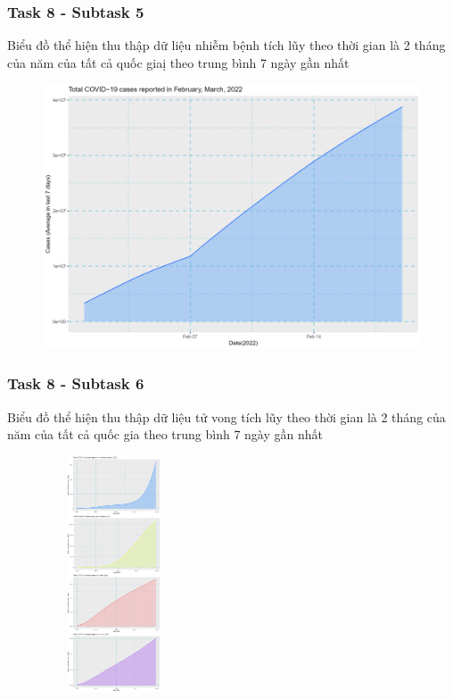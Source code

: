 \documentclass[english,10pt,table]{beamer}
\begin{document}
{
    \frametitle{Task 8 - Subtask 5}
    \begin{block}{Biểu đồ thể hiện thu thập dữ liệu nhiễm bệnh tích lũy theo thời gian là 2 tháng của năm của tất cả quốc giaị theo trung bình 7 ngày gần nhất}
    \begin{figure}[H]
			\centering
			\includegraphics[scale=0.1]{images/8.5.3.png}
	\end{figure}
    \end{block}
}
\frame
{
    \frametitle{Task 8 - Subtask 6}
    \begin{block}{Biểu đồ thể hiện thu thập dữ liệu tử vong tích lũy theo thời gian là 2 tháng của năm của tất cả quốc gia theo trung bình 7 ngày gần nhất}
    \begin{figure}[H]
			\centering
			\includegraphics[height=7cm,width=4.2cm]{images/8.6.1.png}
	\end{figure}
    \end{block}
}
\frame
\end{document}
